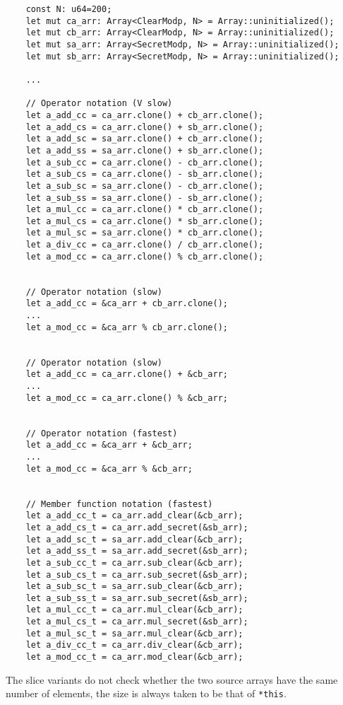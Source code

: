 \begin{lstlisting}
    const N: u64=200;
    let mut ca_arr: Array<ClearModp, N> = Array::uninitialized();
    let mut cb_arr: Array<ClearModp, N> = Array::uninitialized();
    let mut sa_arr: Array<SecretModp, N> = Array::uninitialized();
    let mut sb_arr: Array<SecretModp, N> = Array::uninitialized();

    ...

    // Operator notation (V slow)
    let a_add_cc = ca_arr.clone() + cb_arr.clone();
    let a_add_cs = ca_arr.clone() + sb_arr.clone();
    let a_add_sc = sa_arr.clone() + cb_arr.clone();
    let a_add_ss = sa_arr.clone() + sb_arr.clone();
    let a_sub_cc = ca_arr.clone() - cb_arr.clone();
    let a_sub_cs = ca_arr.clone() - sb_arr.clone();
    let a_sub_sc = sa_arr.clone() - cb_arr.clone();
    let a_sub_ss = sa_arr.clone() - sb_arr.clone();
    let a_mul_cc = ca_arr.clone() * cb_arr.clone();
    let a_mul_cs = ca_arr.clone() * sb_arr.clone();
    let a_mul_sc = sa_arr.clone() * cb_arr.clone();
    let a_div_cc = ca_arr.clone() / cb_arr.clone();
    let a_mod_cc = ca_arr.clone() % cb_arr.clone();

    
    // Operator notation (slow)
    let a_add_cc = &ca_arr + cb_arr.clone();
    ...
    let a_mod_cc = &ca_arr % cb_arr.clone();


    // Operator notation (slow)
    let a_add_cc = ca_arr.clone() + &cb_arr;
    ...
    let a_mod_cc = ca_arr.clone() % &cb_arr;


    // Operator notation (fastest)
    let a_add_cc = &ca_arr + &cb_arr;
    ...
    let a_mod_cc = &ca_arr % &cb_arr;


    // Member function notation (fastest)
    let a_add_cc_t = ca_arr.add_clear(&cb_arr);
    let a_add_cs_t = ca_arr.add_secret(&sb_arr);
    let a_add_sc_t = sa_arr.add_clear(&cb_arr);
    let a_add_ss_t = sa_arr.add_secret(&sb_arr);
    let a_sub_cc_t = ca_arr.sub_clear(&cb_arr);
    let a_sub_cs_t = ca_arr.sub_secret(&sb_arr);
    let a_sub_sc_t = sa_arr.sub_clear(&cb_arr);
    let a_sub_ss_t = sa_arr.sub_secret(&sb_arr);
    let a_mul_cc_t = ca_arr.mul_clear(&cb_arr);
    let a_mul_cs_t = ca_arr.mul_secret(&sb_arr);
    let a_mul_sc_t = sa_arr.mul_clear(&cb_arr);
    let a_div_cc_t = ca_arr.div_clear(&cb_arr);
    let a_mod_cc_t = ca_arr.mod_clear(&cb_arr);
\end{lstlisting}
The slice variants do not check whether the two source arrays have
the same number of elements, the size is always taken to be that
of \verb|*this|.

